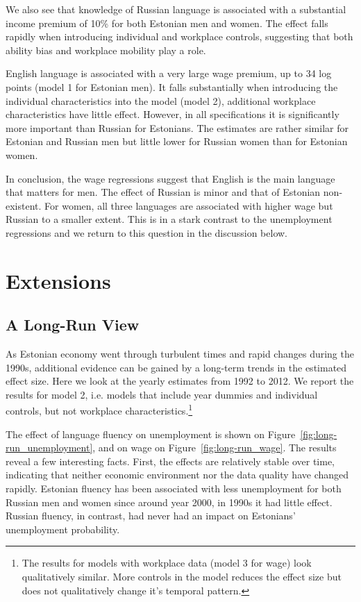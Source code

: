\documentclass[12pt, a4paper]{article}
\begin{document}
We also see that knowledge of Russian language is associated with a
substantial income premium of 10\% for both Estonian men and women.
The effect falls rapidly when introducing
individual and workplace controls, suggesting that both ability bias
and workplace mobility play a role.

English language is associated with a very large
wage premium, up to 34 log points (model 1 for
Estonian men). It falls substantially when introducing the
individual characteristics into the model (model 2), additional
workplace characteristics have little effect.  However, in all
specifications it is
significantly more
important than Russian for Estonians. The estimates are rather
similar for Estonian and Russian men but little lower for Russian
women than for Estonian women.

In conclusion, the wage regressions suggest that English is the main
language that matters for men.  The effect of Russian is minor and
that of Estonian non-existent.  For women, all three languages are
associated with higher wage but Russian to a smaller extent.
This is in a stark contrast to the unemployment regressions and we return to
this question in the discussion below.


\section{Extensions}
\label{sec:extensions}

\subsection{A Long-Run View}
\label{sec:long-run}

As Estonian economy went through turbulent times and rapid changes
during the 1990s, additional evidence can be gained by a long-term
trends in the estimated effect size.  Here we look at the yearly estimates from 1992 to 2012.
We report the results for model 2, i.e. models that include year
dummies and individual controls, but not workplace
characteristics.\footnote{The results for models with workplace data (model
  3 for wage)
  look qualitatively similar.  More controls in the model reduces the effect size but does not qualitatively
  change it's temporal pattern.}

The effect of language fluency on unemployment is shown on
Figure~\ref{fig:long-run_unemployment}, and on wage on
Figure~\ref{fig:long-run_wage}.
The results reveal a few interesting facts.  First, the effects are
relatively stable over time, indicating that neither economic
environment nor the data quality have changed rapidly.  Estonian
fluency has been associated with less unemployment for both Russian men and
women since around year 2000, in 1990s it had little effect.  Russian fluency,
in contrast, had never had an impact on Estonians' unemployment probability.
\end{document}
